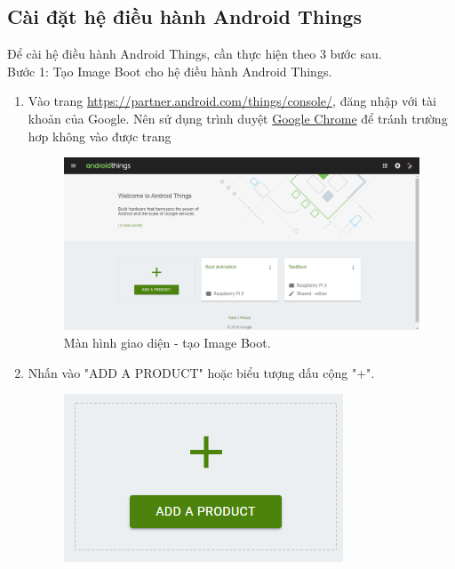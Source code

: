 \subsection{Cài đặt hệ điều hành Android Things}
Để cài hệ điều hành Android Things, cần thực hiện theo 3 bước sau.\\
Bước 1: Tạo Image Boot cho hệ điều hành Android Things.
\begin{enumerate}
\item Vào trang \url{https://partner.android.com/things/console/}, đăng nhập với tài khoản của Google. Nên sử dụng trình duyệt \href{https://www.google.com/chrome/}{Google Chrome} để tránh trường hơp không vào được trang
\begin{center}
\begin{figure}[htp]
\begin{center}
\includegraphics[scale=0.4]{image3/sat1.png}
\end{center}
\caption{Màn hình giao diện - tạo Image Boot.}
\label{refhinh1}
\end{figure}
\end{center}
\item Nhấn vào "ADD A PRODUCT" hoặc biểu tượng dấu cộng "+".
\begin{center}
\begin{figure}[htp]
\begin{center}
\includegraphics[scale=1]{image3/sat2.png}
\end{center}

\end{figure}
\end{center}
\end{enumerate}
